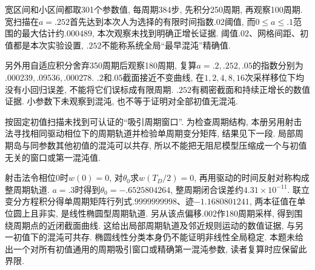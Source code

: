 宽区间和小区间都取301个参数值, 每周期384步, 先积分250周期, 再观察100周期. 宽扫描在$a=.252$首先达到本次人为选择的有限时间指数$.02$阈值, 而$0\le a\le.1$范围的最大估计约$.000489$, 本次观察未找到明确正增长证据. 阈值$.02$、网格间距、初值都是本次实验设置, $.252$不能称系统全局“最早混沌”精确值.

另外用自适应积分舍弃350周期后观察180周期, 复算$a=.2,.252,.05$的指数分别为$.000239,.09536,.000278$. $.2$和$.05$截面接近不变曲线, 在$1,2,4,8,16$次采样移位下均没有小回归误差, 不能将它们误标成有限周期. $.252$有稠密截面和持续正增长的数值证据. 小参数下未观察到混沌, 也不等于证明对全部初值无混沌.

按固定初值扫描未找到可认证的“吸引周期窗口”. 为检查周期结构, 本册另用射击法寻找相同驱动相位下的周期轨道并检验单周期变分矩阵, 结果见下一段. 局部周期岛与同参数其他初值的混沌可以共存, 所以不能把无阻尼模型压缩成一个与初值无关的窗口或第一混沌值.

射击法令相位0时$w(0)=0$, 对$\theta_0$求$w(T_D/2)=0$, 再用驱动的时间反射对称构成整周期轨道. $a=.3$时得到$\theta_0=-.6525804264$, 整周期闭合误差约$4.31\times10^{-11}$. 联立变分方程积分得单周期矩阵行列式$.9999999998$、迹$-1.1680801241$, 两本征值在单位圆上且非实, 是线性椭圆型周期轨道. 另从该点偏移$.002$作180周期采样, 得到围绕周期点的近闭截面曲线. 这给出局部周期轨道及邻近规则运动的数值证据, 与另一初值下的混沌可共存. 椭圆线性分类本身仍不能证明非线性全局稳定. 本题未给出一个对所有初值通用的周期吸引窗口或精确第一混沌参数, 读者复算时应保留此界限.
